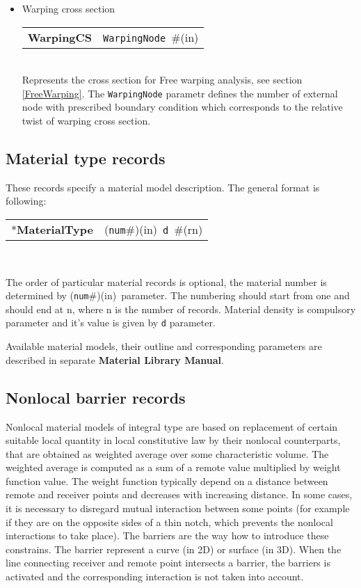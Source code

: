 \documentclass[a4paper]{article}
\makeatletter
\newcommand{\param}[1]{\texttt{#1}} %
\newcommand{\field}[2]{\param{#1}~\#{\tiny(#2)}} %
\newcommand{\componentNum}{(\param{num}\#){\tiny(in)}} %
\newcommand{\entKeyword}[1]{*\textbf{#1}} %
\newcommand{\entKeywordInst}[1]{\textbf{#1}} %
\newenvironment{record}[1][]{\begin{tabular}{|ll}}{\end{tabular}\\}
\newcommand{\recentry}[2]{{#1}&{#2}\\}
\newcounter{rcc}
\newenvironment{record}[1][\textwidth]{\setcounter{rcc}{0}\begin{tabular*}{#1}{|ll@{\extracolsep{\fill}}r}}{\end{tabular*}\\}
\newcommand{\recentry}[2]{\ifthenelse{\value{rcc}>0}{&$\backslash$ \\}{\setcounter{rcc}{1}}{#1}&{#2}}
\makeatother
\begin{document}
\begin{itemize}
\item
Warping cross section \\
\begin{record}[0.9\textwidth]
\recentry{\entKeywordInst{WarpingCS}}{\field{WarpingNode}{in}}
\end{record}
Represents the cross section for Free warping analysis, see section \ref{FreeWarping}. The \param{WarpingNode} parametr defines the number of external node with prescribed boundary condition which corresponds to the relative twist of warping cross section.

\end{itemize}

\subsection{Material type  records}
\label{_MaterialTypeRecords}
These records specify a material model  description. The general format is
following:

\noindent
\begin{record}
  \recentry{\entKeyword{MaterialType}}{\componentNum\ \field{d}{rn}}
\end{record}

The order of particular material records is optional, the material number is determined by \componentNum\ parameter.
The numbering should start from one and should end at n, where n is the number of records.
Material density is compulsory parameter and it's value is given by
\param{d} parameter.

Available material models, their outline and
corresponding parameters are described in separate \textbf{Material Library Manual}.

\subsection{Nonlocal barrier records}
\label{_NonlocalBarrierRecords}
Nonlocal material models of integral type are based on replacement of
certain suitable local quantity in local constitutive law by their
nonlocal counterparts, that are obtained as weighted average over
some characteristic volume. The weighted average is computed as a sum
of a remote value multiplied by weight function value. The weight
function typically depend on a distance between remote and receiver
points and decreases with increasing distance. In some cases, it is
necessary to disregard mutual interaction between some points (for
example if they are on the opposite sides of a thin notch, which
prevents the nonlocal interactions to take place). The barriers are
the way how to introduce these constrains. The barrier represent a
curve (in 2D) or surface (in 3D). When the line connecting receiver and
remote point intersects a barrier, the barriers is activated and the
corresponding interaction is not taken into account.
\end{document}
